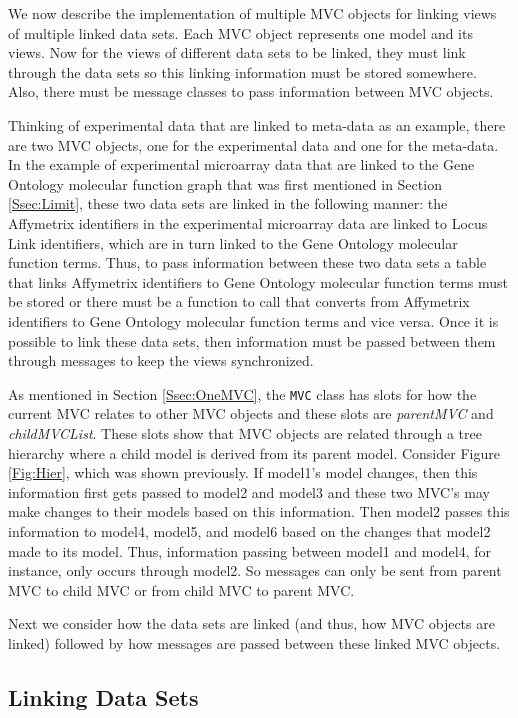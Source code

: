 \documentclass{article}[11pt]
\newcommand{\Robject}[1]{{\texttt{#1}}}
\newcommand{\Rslot}[1]{\textsl{#1}}
\begin{document}
We now describe the implementation of multiple MVC objects for linking views
of multiple linked data sets.  Each MVC object represents one model and
its views.  Now for the views of different data sets to be linked, they must
link through the data sets so this linking information must be stored
somewhere.  Also, there must be message classes to pass information between
MVC objects. 

Thinking of experimental data that are linked to meta-data as an example, there
are two MVC objects, one for the experimental data and one for the
meta-data.  In the example of experimental microarray data that are linked to
the Gene Ontology molecular function graph that was first mentioned in Section
\ref{Ssec:Limit}, these two data sets are linked in the following manner: the
Affymetrix identifiers in the experimental microarray data are linked to Locus
Link identifiers, which are in turn linked to the Gene Ontology molecular
function terms.  Thus, to pass information between these two data sets a table
that links Affymetrix identifiers to Gene Ontology molecular function terms
must be stored or there must be a function to call that converts from
Affymetrix identifiers to Gene Ontology molecular function terms and vice
versa.  Once it is possible to link these data sets, then information must be
passed between them through messages to keep the views synchronized.

As mentioned in Section \ref{Ssec:OneMVC}, the \Robject{MVC} class has slots
for how the current MVC relates to other MVC objects and these slots are
\Rslot{parentMVC} and \Rslot{childMVCList}.  These slots show that MVC objects
are related through a tree hierarchy where a child model is derived from its
parent model.  Consider Figure \ref{Fig:Hier}, which was shown previously.  
If model1's model changes, then this information first gets passed to model2
and model3 and these two MVC's may make changes to their models based on this
information.  Then model2 passes this information to model4, model5, and
model6 based on the changes that model2 made to its model.  Thus, information
passing between model1 and model4, for instance, only occurs through model2.
So messages can only be sent from parent MVC to child MVC or from child MVC to
parent MVC. 

Next we consider how the data sets are linked (and thus, how MVC
objects are linked) followed by how messages are passed between these
linked MVC objects. 

\subsection{Linking Data Sets}\label{Ssec:MultLink}
\end{document}
